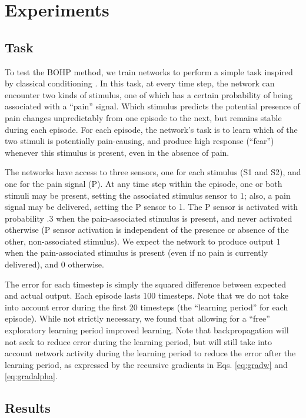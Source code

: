 \documentclass{article}
\begin{document}
\section{Experiments}

\subsection{Task}

To test the BOHP method, we train networks to perform a simple task inspired by
classical conditioning \cite{Fanselow2016-gz}. In this task, at every time step, the network can encounter two kinds of
stimulus, one of which has a certain probability of being associated with a
``pain'' signal. Which stimulus predicts the potential presence of pain 
changes unpredictably from one episode to the next, but remains stable during each
episode.  For each episode, the network's task is to learn which of
the two stimuli is
potentially pain-causing, and produce high response (``fear'') whenever
this stimulus is present, even in the absence of pain. 

The networks have access to three sensors, one for each stimulus (S1 and S2),
and one for the pain signal (P). At any time step within the episode, one or
both stimuli may be present, setting the associated stimulus sensor to 1; also,
a pain signal may be delivered, setting the P sensor to 1. The P sensor is
activated with probability .3 when the pain-associated stimulus is present, and
never activated otherwise (P sensor activation is independent of the presence or
absence of the other, non-associated stimulus). We expect the network to
produce output 1 when the pain-associated stimulus is present (even if no pain
is currently delivered), and 0 otherwise.

The error for each timestep is simply the squared difference between expected
and actual output. Each episode lasts 100 timesteps. Note that we do not take
into account error during the first 20 timesteps (the ``learning period'' for
each episode). While not strictly necessary, we found that allowing for a
``free'' exploratory learning period improved learning. Note that
backpropagation will not seek to reduce error during the learning period, but
will still take into account network activity during the learning period to
reduce the error after the learning period, as expressed by the recursive
gradients in Eqs. \ref{eq:gradw} and \ref{eq:gradalpha}.

\subsection{Results}
\end{document}
